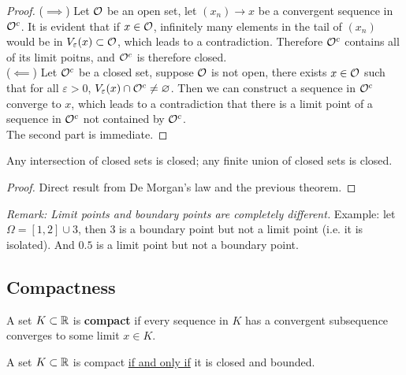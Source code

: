 \documentclass[11pt]{article}
\begin{document}
	\begin{proof}
		($\implies$) Let $\mathcal{{O}}$ be an open set, let $(x_n) \to x$ be a convergent sequence in $\mathcal{{O}}^c$. It is evident that if $x \in \mathcal{{O}}$, infinitely many elements in the tail of $(x_n)$ would be in $V_\varepsilon(x) \subset \mathcal{{O}}$, which leads to a contradiction. Therefore $\mathcal{{O}}^c$ contains all of its limit poitns, and $\mathcal{{O}}^c$ is therefore closed.
		\\($\impliedby$) Let $\mathcal{{O}}^c$ be a closed set, suppose $\mathcal{{O}}$ is not open, there exists $x \in \mathcal{{O}}$ such that for all $\varepsilon > 0$, $V_\varepsilon(x) \cap \mathcal{{O}}^c \neq \varnothing$. Then we can construct a sequence in $\mathcal{{O}}^c$ converge to $x$, which leads to a contradiction that there is a limit point of a sequence in $\mathcal{{O}}^c$ not contained by $\mathcal{{O}}^c$. \\
		The second part is immediate.
	\end{proof}
	
	\begin{theorem}
		Any intersection of closed sets is closed; any finite union of closed  sets is closed.
	\end{theorem}
	
	\begin{proof}
		Direct result from De Morgan's law and the previous theorem.
	\end{proof}
	
	\emph{Remark: Limit points and boundary points are completely different.} Example: let $\Omega = [1, 2] \cup {3}$, then $3$ is a boundary point but not a limit point (i.e. it is isolated). And $0.5$ is a limit point but not a boundary point.
	
	\subsection{Compactness}
	\begin{definition}
		A set $K \subset \mathbb{R}$ is \textbf{compact} if every sequence in $K$ has a convergent subsequence converges to some limit $x \in K$.
	\end{definition}
	
	\begin{theorem}
		A set $K \subset \mathbb{R}$ is compact \ul{if and only if} it is closed and bounded.
	\end{theorem}
	
\end{document}
